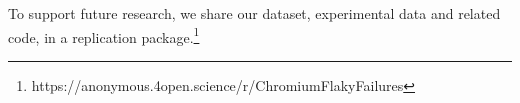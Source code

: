 
To support future research, we share our dataset, experimental data and related code, in a replication package.\footnote{https://anonymous.4open.science/r/ChromiumFlakyFailures}

